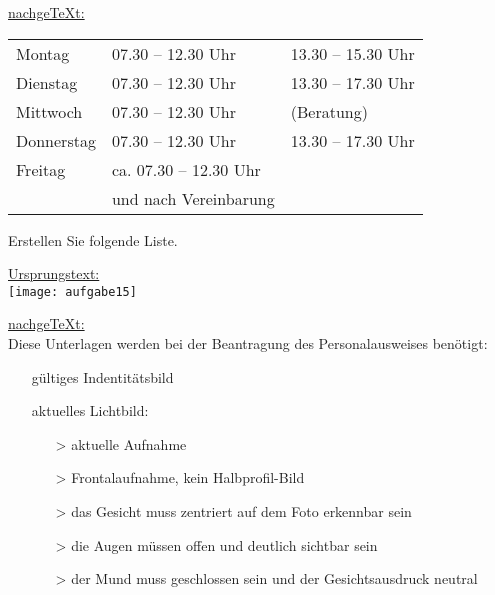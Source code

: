 \noindent \underline{nachge\TeX t:}\\
\begin{singlespacing}
\hspace{-1.45cm}
\begin{tabular}{l l l}
Montag 		& 07.30 – 12.30 Uhr & \hspace{-0.9cm} 13.30 – 15.30 Uhr \\
Dienstag 	& 07.30 – 12.30 Uhr & \hspace{-0.9cm} 13.30 – 17.30 Uhr \\
Mittwoch 	& 07.30 – 12.30 Uhr & \hspace{-0.9cm} (Beratung) \\
Donnerstag 	& 07.30 – 12.30 Uhr & \hspace{-0.9cm} 13.30 – 17.30 Uhr \\
Freitag 	& \hspace{-0.74cm} ca. 07.30 – 12.30 Uhr &  \\
& und nach Vereinbarung & \\
\end{tabular}
\end{singlespacing}

\pagebreak
\begin{aufgabe}
Erstellen Sie folgende Liste.
\end{aufgabe}

\noindent \underline{Ursprungstext:} \\
\noindent\texttt{[image: aufgabe15]}

\noindent \underline{nachge\TeX t:}\\
Diese Unterlagen werden bei der Beantragung des Personalausweises benötigt:

\begin{itemize}
 \item[\ding{51}] gültiges Indentitätsbild
 \item[\ding{51}] aktuelles Lichtbild:
  \begin{itemize}
   \item[>] aktuelle Aufnahme
   \item[>] Frontalaufnahme, kein Halbprofil-Bild
   \item[>] das Gesicht muss zentriert auf dem Foto erkennbar sein
   \item[>] die Augen müssen offen und deutlich sichtbar sein
   \item[>] der Mund muss geschlossen sein und der Gesichtsausdruck neutral
  \end{itemize}
\end{itemize}


